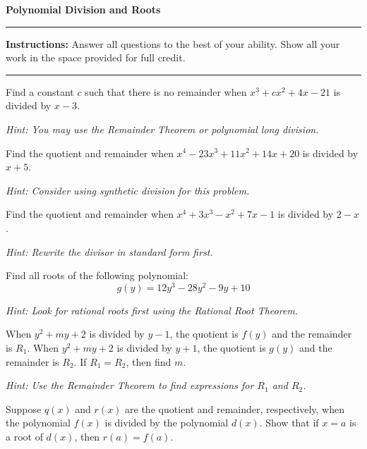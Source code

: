 \documentclass[12pt]{exam}
\newcommand{\examtitle}{Polynomial Division and Roots}
\newcommand{\instructions}{
    \noindent\rule{\textwidth}{0.5pt}
    \begin{center}
    \textbf{Instructions:} Answer all questions to the best of your ability. Show all your work in the space provided for full credit.
    \end{center}
    \noindent\rule{\textwidth}{0.5pt}
}
\begin{document}
\begin{center}
\textbf{\Large \examtitle} \\
\vspace{0.5cm}
\hspace{0.1\textwidth}
\end{center}

\instructions
\vspace{0.5cm}

\begin{questions}

\pointsinrightmargin

\question[8]
Find a constant $c$ such that there is no remainder when $x^3 + cx^2 + 4x - 21$ is divided by $x - 3$.

\textit{Hint: You may use the Remainder Theorem or polynomial long division.}
\vspace*{4cm}

\question[10]
Find the quotient and remainder when $x^4 - 23x^3 + 11x^2 + 14x + 20$ is divided by $x + 5$.

\textit{Hint: Consider using synthetic division for this problem.}
\vspace*{4cm}

\question[8]
Find the quotient and remainder when $x^4 + 3x^3 - x^2 + 7x - 1$ is divided by $2 - x$.

\textit{Hint: Rewrite the divisor in standard form first.}
\vspace*{4cm}

\newpage

\question[10]
Find all roots of the following polynomial:
$$g(y) = 12y^3 - 28y^2 - 9y + 10$$

\textit{Hint: Look for rational roots first using the Rational Root Theorem.}
\vspace*{5cm}

\question[12]
When $y^2 + my + 2$ is divided by $y - 1$, the quotient is $f(y)$ and the remainder is $R_1$. When $y^2 + my + 2$ is divided by $y + 1$, the quotient is $g(y)$ and the remainder is $R_2$. If $R_1 = R_2$, then find $m$.

\textit{Hint: Use the Remainder Theorem to find expressions for $R_1$ and $R_2$.}
\vspace*{4cm}

\newpage

\question[10]
Suppose $q(x)$ and $r(x)$ are the quotient and remainder, respectively, when the polynomial $f(x)$ is divided by the polynomial $d(x)$. Show that if $x = a$ is a root of $d(x)$, then $r(a) = f(a)$.


\end{questions}
\end{document}
